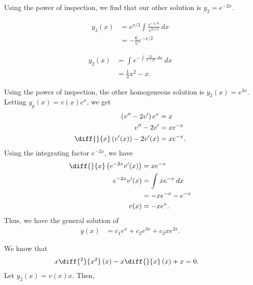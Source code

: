\documentclass[10pt]{mypackage}
\begin{document}
\begin{solution}[Problem 2]
  Using the power of inspection, we find that our other solution is $y_2 = e^{-2x}$.
\end{solution}
\begin{solution}[Problem 8]
  \begin{align*}
    y_2(x) &= e^{x/3}\int_{}^{} \frac{e^{-x/6}}{e^{2x/3}}\:dx\\
           &= -\frac{6}{5}e^{-x/2}
  \end{align*}
\end{solution}
\begin{solution}[Problem 16]
  \begin{align*}
    y_2(x) &= \int_{}^{} e^{-\int_{}^{} \frac{2x}{1-x^2}\:dx}\:dx\\
           &= \frac{1}{3}x^2 - x.
  \end{align*}
\end{solution}
\begin{solution}[Problem 20]
  Using the power of inspection, the other homogeneous solution is $y_2(x) = e^{3x}$. Letting $y_p(x) = v(x)e^{x}$, we get
  \begin{align*}
    \left(v'' - 2v'\right)e^{x} &= x\\
    v''-2v' &= xe^{-x}\\
    \diff{}{x}\left(v'(x)\right) - 2v'(x) &= xe^{-x}.
  \end{align*}
  Using the integrating factor $e^{-2x}$, we have
  \begin{align*}
    \diff{}{x}\left(e^{-2x}v'(x)\right) &= xe^{-x}\\
    e^{-2x}v'(x) &= \int_{}^{} xe^{-x}\:dx\\
                 &= -xe^{-x} - e^{-x}\\
    v(x) &= -xe^{x}.
  \end{align*}
  Thus, we have the general solution of
  \begin{align*}
    y(x) &= c_1e^{x} + c_2e^{3x} + c_3xe^{2x}.
  \end{align*}
\end{solution}
\begin{solution}[Problem 22]
  We know that
  \begin{align*}
    x\diff{^2}{x^2}\left(x\right) - x \diff{}{x}\left(x\right) + x &= 0.
  \end{align*}
  Let $y_2(x) = v(x) x$. Then,
\end{solution}
\end{document}
